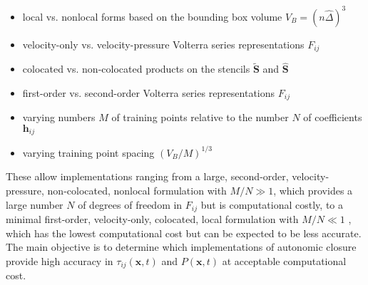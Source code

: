 \begin{itemize}
\item local vs. nonlocal forms based on the bounding box volume  $V_B = (n\widehat{\Delta})^3$ 
\item velocity-only vs. velocity-pressure Volterra series representations $F_{ij}$
\item colocated vs. non-colocated products on the stencils $\widetilde{\mathbf{S}}$  and  $\widehat{\mathbf{S}}$ 
\item first-order vs. second-order Volterra series representations $F_{ij}$
\item varying numbers $M$ of training points relative to the number $N$ of coefficients $\mathbf{h}_{ij}$  
\item varying training point spacing  $(V_B/M)^{1/3}$
\end{itemize}

These allow implementations ranging from a large, second-order, velocity-pressure, non-colocated, nonlocal formulation with $M/N \gg 1$, which provides a large number $N$ of degrees of freedom in $F_{ij}$  but is computational costly, to a minimal first-order, velocity-only, colocated, local formulation with $M/N \ll 1$  , which has the lowest computational cost but can be expected to be less accurate. The main objective is to determine which implementations of autonomic closure provide high accuracy in  $\tau_{ij}(\mathbf{x},t)$ and $P(\mathbf{x},t)$   at acceptable computational cost.

